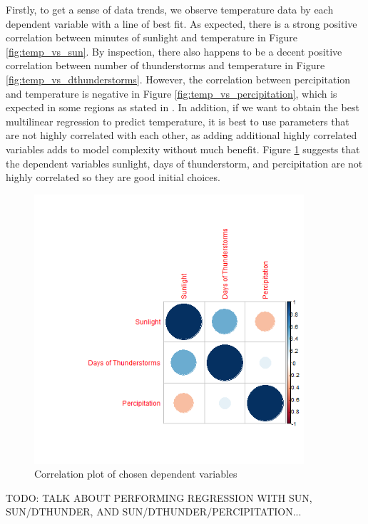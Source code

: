 Firstly, to get a sense of data trends, we observe temperature data by each dependent variable with a line of best fit. As expected, there is a strong positive correlation between minutes of sunlight and temperature in Figure \ref{fig:temp_vs_sun}. By inspection, there also happens to be a decent positive correlation between number of thunderstorms and temperature in Figure \ref{fig:temp_vs_dthunderstorms}. However, the correlation between percipitation and temperature is negative in Figure \ref{fig:temp_vs_percipitation}, which is expected in some regions as stated in \cite{epa_utah}. In addition, if we want to obtain the best multilinear regression to predict temperature, it is best to use parameters that are not highly correlated with each other, as adding additional highly correlated variables adds to model complexity without much benefit. Figure \ref{fig:correlation_plot} suggests that the dependent variables sunlight, days of thunderstorm, and percipitation are not highly correlated so they are good initial choices.

\begin{figure}
  \centering
  \includegraphics[width=10cm]{../data/img/correlation_plot.PNG}
  \caption{Correlation plot of chosen dependent variables}
  \label{fig:correlation_plot}
\end{figure}

TODO: TALK ABOUT PERFORMING REGRESSION WITH SUN, SUN/DTHUNDER, AND SUN/DTHUNDER/PERCIPITATION... 

\begin{table}[ht]
 \begin{centering}
 \caption{Temperature Difference Statistics}
 \label{tab:lin_regression1}
 \end{centering}
\end{table}

